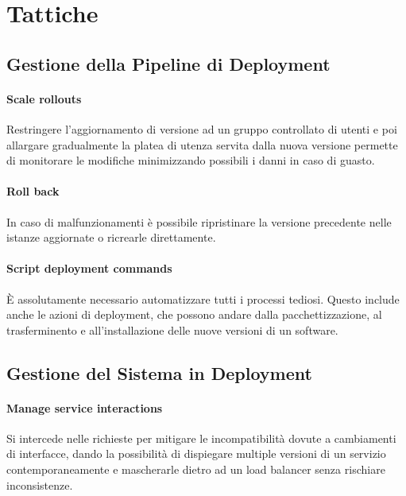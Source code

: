 \documentclass[a4paper,11pt,oneside, table]{article}
\begin{document}
  \section{Tattiche}

  \subsection{Gestione della Pipeline di Deployment}

  \paragraph{Scale rollouts}

  Restringere l'aggiornamento di versione ad un gruppo controllato di utenti e poi allargare gradualmente la platea di utenza servita dalla nuova versione permette di monitorare le modifiche minimizzando possibili i danni in caso di guasto.

  \paragraph{Roll back}

  In caso di malfunzionamenti \`e possibile ripristinare la versione precedente nelle istanze aggiornate o ricrearle direttamente.

  \paragraph{Script deployment commands}

  \`E assolutamente necessario automatizzare tutti i processi tediosi. Questo include anche le azioni di deployment, che possono andare dalla pacchettizzazione, al trasferminento e all'installazione delle nuove versioni di un software.

  \subsection{Gestione del Sistema in Deployment}

  \paragraph{Manage service interactions}

  Si intercede nelle richieste per mitigare le incompatibilit\`a dovute a cambiamenti di interfacce, dando la possibilit\`a di dispiegare multiple versioni di un servizio contemporaneamente e mascherarle dietro ad un load balancer senza rischiare inconsistenze.
\end{document}
